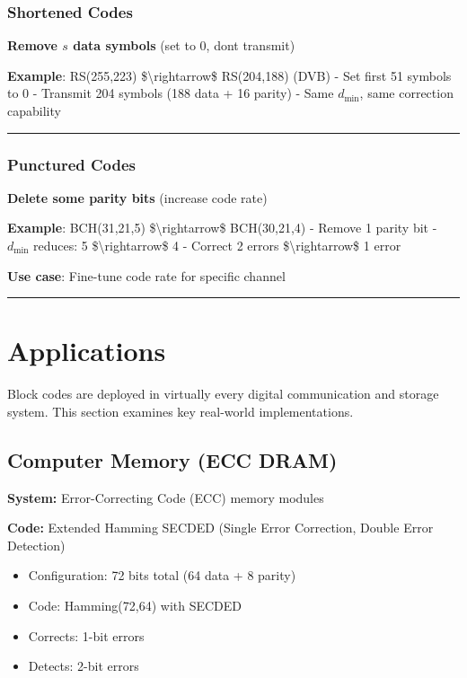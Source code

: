 \subsubsection{Shortened Codes}\label{shortened-codes}

\textbf{Remove \(s\) data symbols} (set to 0, don\textquotesingle t
transmit)

\textbf{Example}: RS(255,223) \$\textbackslash rightarrow\$ RS(204,188)
(DVB) - Set first 51 symbols to 0 - Transmit 204 symbols (188 data + 16
parity) - Same \(d_{\min}\), same correction capability

\begin{center}\rule{0.5\linewidth}{0.5pt}\end{center}

\subsubsection{Punctured Codes}\label{punctured-codes}

\textbf{Delete some parity bits} (increase code rate)

\textbf{Example}: BCH(31,21,5) \$\textbackslash rightarrow\$
BCH(30,21,4) - Remove 1 parity bit - \(d_{\min}\) reduces: 5
\$\textbackslash rightarrow\$ 4 - Correct 2 errors
\$\textbackslash rightarrow\$ 1 error

\textbf{Use case}: Fine-tune code rate for specific channel

\begin{center}\rule{0.5\linewidth}{0.5pt}\end{center}

\section{Applications}\label{applications}

Block codes are deployed in virtually every digital communication and storage system. This section examines key real-world implementations.

\subsection{Computer Memory (ECC DRAM)}

\textbf{System:} Error-Correcting Code (ECC) memory modules

\textbf{Code:} Extended Hamming SECDED (Single Error Correction, Double Error Detection)
\begin{itemize}
\item Configuration: 72 bits total (64 data + 8 parity)
\item Code: Hamming(72,64) with SECDED
\item Corrects: 1-bit errors
\item Detects: 2-bit errors
\end{itemize}

